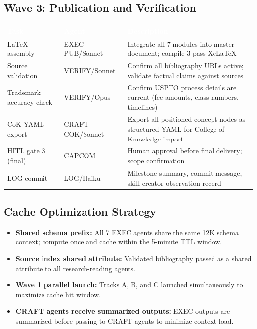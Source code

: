 \documentclass[11pt,letterpaper]{article}
\newcommand{\tableheader}[1]{\textbf{\sffamily\textcolor{white}{#1}}}
\begin{document}
\subsection{Wave 3: Publication and Verification}

\begin{tabularx}{\textwidth}{L{3.5cm}L{2cm}X}
\toprule
{}
\tableheader{Task} & \tableheader{Agent} & \tableheader{Description} \\
\midrule
LaTeX assembly & EXEC-PUB/Sonnet & Integrate all 7 modules into master document; compile 3-pass XeLaTeX \\
Source validation & VERIFY/Sonnet & Confirm all bibliography URLs active; validate factual claims against sources \\
Trademark accuracy check & VERIFY/Opus & Confirm USPTO process details are current (fee amounts, class numbers, timelines) \\
CoK YAML export & CRAFT-COK/Sonnet & Export all positioned concept nodes as structured YAML for College of Knowledge import \\
HITL gate 3 (final) & CAPCOM & Human approval before final delivery; scope confirmation \\
LOG commit & LOG/Haiku & Milestone summary, commit message, skill-creator observation record \\
\bottomrule
\end{tabularx}

\subsection{Cache Optimization Strategy}

\begin{itemize}[noitemsep]
  \item \textbf{Shared schema prefix:} All 7 EXEC agents share the same 12K schema context; compute once and cache within the 5-minute TTL window.
  \item \textbf{Source index shared attribute:} Validated bibliography passed as a shared attribute to all research-reading agents.
  \item \textbf{Wave 1 parallel launch:} Tracks A, B, and C launched simultaneously to maximize cache hit window.
  \item \textbf{CRAFT agents receive summarized outputs:} EXEC outputs are summarized before passing to CRAFT agents to minimize context load.
\end{itemize}
\end{document}
